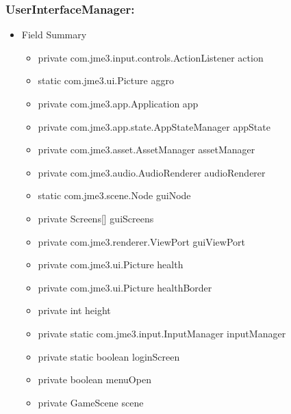 \documentclass[letterpaper]{article}
\begin{document}
								\subsubsection*{UserInterfaceManager:}
								\vspace{0.1in}	
									\begin{itemize}
										\item	Field Summary
												\begin{itemize}
													\item	private com.jme3.input.controls.ActionListener 	action 
		\item static com.jme3.ui.Picture 	aggro 
		 
		\item private com.jme3.app.Application 	app 
		 
		\item private com.jme3.app.state.AppStateManager 	appState 
		 
		\item private com.jme3.asset.AssetManager 	assetManager 
		 
		\item private com.jme3.audio.AudioRenderer 	audioRenderer 
		 
		\item static com.jme3.scene.Node 	guiNode 
		 
		\item private Screens[] 	guiScreens 
		 
		\item private com.jme3.renderer.ViewPort 	guiViewPort 
		 
		\item private com.jme3.ui.Picture 	health 
		 
		\item private com.jme3.ui.Picture 	healthBorder 
		 
		\item private int 	height 
		 
		\item private static com.jme3.input.InputManager 	inputManager 
		 
		\item private static boolean 	loginScreen 
		 
		\item private boolean 	menuOpen 
		 
		\item private GameScene 	scene 
		 

\end{itemize}
\end{itemize}
\end{document}
